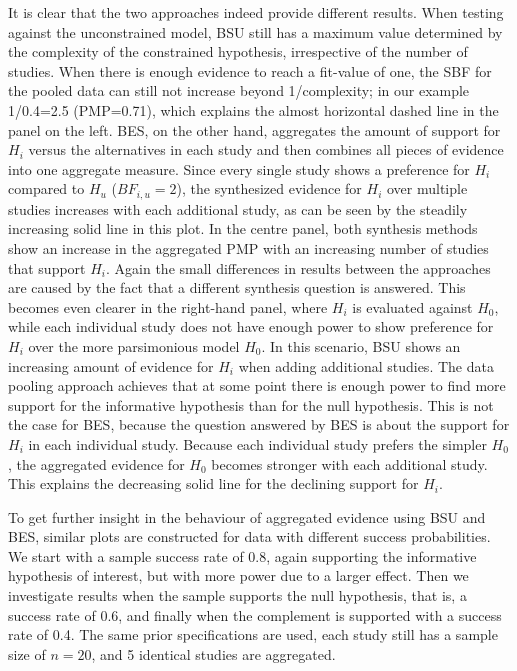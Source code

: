 \documentclass[11pt,reqno]{article}
\begin{document}
It is clear that the two approaches indeed provide different results. When testing against the unconstrained model, BSU still has a maximum value determined by the complexity of the constrained hypothesis, irrespective of the number of studies. When there is enough evidence to reach a fit-value of one, the SBF for the pooled data can still not increase beyond 1/complexity; in our example 1/0.4=2.5 (PMP=0.71), which explains the almost horizontal dashed line in the panel on the left. BES, on the other hand, aggregates the amount of support for $H_i$ versus the alternatives in each study and then combines all pieces of evidence into one aggregate measure. Since every single study shows a preference for $H_i$ compared to $H_u$ ($BF_{i,u}=2$), the synthesized evidence for $H_i$ over multiple studies increases with each additional study, as can be seen by the steadily increasing solid line in this plot. In the centre panel, both synthesis methods show an increase in the aggregated PMP with an increasing number of studies that support $H_i$. Again the small differences in results between the approaches are caused by the fact that a different synthesis question is answered. This becomes even clearer in the right-hand panel, where $H_i$ is evaluated against $H_0$, while each individual study does not have enough power to show preference for $H_i$ over the more parsimonious model $H_0$. In this scenario, BSU shows an increasing amount of evidence for $H_i$ when adding additional studies. The data pooling approach achieves that at some point there is enough power to find more support for the informative hypothesis than for the null hypothesis. This is not the case for BES, because the question answered by BES is about the support for $H_i$ in each individual study. Because each individual study prefers the simpler $H_0$, the aggregated evidence for $H_0$ becomes stronger with each additional study. This explains the decreasing solid line for the declining support for $H_i$.

To get further insight in the behaviour of aggregated evidence using BSU and BES, similar plots are constructed for data with different success probabilities. We start with a sample success rate of 0.8, again supporting the informative hypothesis of interest, but with more power due to a larger effect. Then we investigate results when the sample supports the null hypothesis, that is, a success rate of 0.6, and finally when the complement is supported with a success rate of 0.4. The same prior specifications are used, each study still has a sample size of $n=20$, and 5 identical studies are aggregated.
\end{document}
